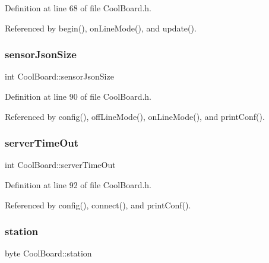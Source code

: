 Definition at line 68 of file Cool\+Board.\+h.



Referenced by begin(), on\+Line\+Mode(), and update().

\mbox{\label{classCoolBoard_a58e4b6072e3ac8b141ec0befb479208e}} 
\subsubsection{\texorpdfstring{sensor\+Json\+Size}{sensorJsonSize}}
{\footnotesize\ttfamily int Cool\+Board\+::sensor\+Json\+Size\hspace{0.3cm}{\ttfamily [private]}}



Definition at line 90 of file Cool\+Board.\+h.



Referenced by config(), off\+Line\+Mode(), on\+Line\+Mode(), and print\+Conf().

\mbox{\label{classCoolBoard_a7a8d8d3d316220cdd049cd63c1aa8fe6}} 
\subsubsection{\texorpdfstring{server\+Time\+Out}{serverTimeOut}}
{\footnotesize\ttfamily int Cool\+Board\+::server\+Time\+Out\hspace{0.3cm}{\ttfamily [private]}}



Definition at line 92 of file Cool\+Board.\+h.



Referenced by config(), connect(), and print\+Conf().

\mbox{\label{classCoolBoard_a164c550df8424e32fe90bce460c7becf}} 
\subsubsection{\texorpdfstring{station}{station}}
{\footnotesize\ttfamily byte Cool\+Board\+::station\hspace{0.3cm}{\ttfamily [private]}}



